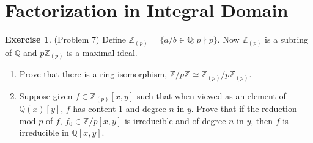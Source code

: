 \documentclass[12pt, psamsfonts]{amsart}
\theoremstyle{definition}
\newtheorem*{exer}{Exercise}
\theoremstyle{remark}
\numberwithin{equation}{section}
\begin{document}
\section{Factorization in Integral Domain}

\begin{exer}{(Problem 7)}
  Define $\mathbb{Z}_{(p)} = \{ a / b \in \mathbb{Q} : p \nmid p \}$.
  Now $\mathbb{Z}_{(p)}$ is a subring of $\mathbb{Q}$ and $p\mathbb{Z}_{(p)}$ is a maximal ideal.
  \begin{enumerate}[label=(\roman*)]
    \item
      Prove that there is a ring isomorphism, $\mathbb{Z}/p\mathbb{Z} \simeq \mathbb{Z}_{(p)} / p\mathbb{Z}_{(p)}$.
    \item
      Suppose given $f \in \mathbb{Z}_{(p)}[x, y]$ such that when viewed as an element of $\mathbb{Q}(x)[y]$, $f$ has content 1 and degree $n$ in $y$.
      Prove that if the reduction mod $p$ of $f$, $f_0 \in \mathbb{Z}/p[x, y]$ is irreducible and of degree $n$ in $y$, then $f$ is irreducible in $\mathbb{Q}[x, y]$.
  \end{enumerate}
\end{exer}
\end{document}
